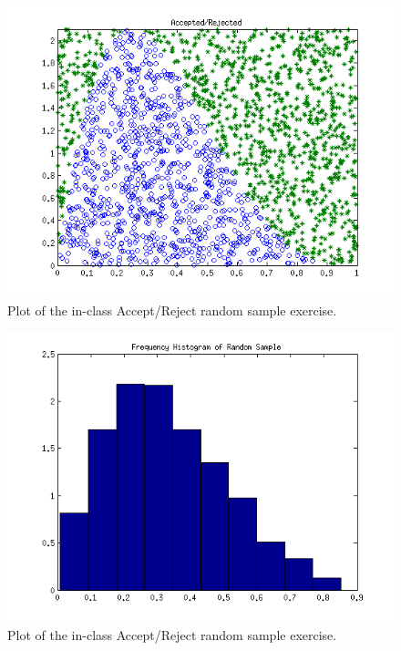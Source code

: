 \documentclass[12pt,a4paper]{article}
\begin{document}
\begin{figure}[ht!]
\begin{center}
\includegraphics[scale=.80]{inClass2_acceptReject.png}
\caption{Plot of the in-class Accept/Reject random sample exercise.}
\label{inclass2fig2}
\end{center}
\end{figure}
\FloatBarrier

\begin{figure}[ht!]
\begin{center}
\includegraphics[scale=.80]{inClass2_acceptReject_hist.png}
\caption{Plot of the in-class Accept/Reject random sample exercise.}
\label{inclass2fig3}
\end{center}
\end{figure}
\FloatBarrier
\end{document}
